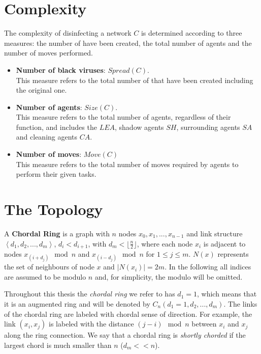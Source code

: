 \section{Complexity}
The complexity of disinfecting a network $C$ is determined according to three measures: 
the number of \bvs have been created, the total number of agents and the number of moves performed.
\begin{itemize}
\item {\bf Number of black viruses}:  $Spread(C)$.\\ 
This measure refers to the total number of \bvs that have been created including the original one.
\item {\bf Number of agents}:  $Size(C)$. \\
This measure refers to the total number of  agents, regardless of their function, and includes the $LEA$, shadow agents $SH$, surrounding agents $SA$ and cleaning agents $CA$. 



\item {\bf Number of moves}: $Move(C)$ \\
This measure refers to the total number of moves required by agents to perform their given tasks.

\end{itemize}



\section{The Topology}
A {\bf  Chordal Ring} is a graph  with   $n$ nodes $x_{0},x_{1},...,x_{n-1}$ and link structure
$\left\langle d_{1}, d_{2}, ..., d_{m}\right\rangle$, $d_{i} < d_{i+1}$, with  $d_m < \lfloor \frac{n}{2} \rfloor $, where
each node $x_{i}$ is adjacent to   nodes $x_{(i+d_{j})}\mod n$ and $x_{(i-d_{j})}\mod n$ for $1\leq j\leq m$.
 $N(x)$  represents the set of neighbours of node $x$ and $|N(x_i)|=2m$. 
In the following  all indices are assumed to be modulo $n$ and, for simplicity, the modulo will be omitted.



Throughout this thesis the {\it chordal ring} we refer to has $d_{1}=1$, which means that
it is an augmented ring and will be denoted by $C_n( d_1=1, d_{2}, ..., d_{m})$. 
The links of the chordal ring are labeled with chordal sense of direction. For example, the link $(x_i,x_j)$ is labeled with the distance $(j-i) \mod n$ between
$x_i$ and $x_j$ along the ring connection.
We say that a chordal ring is   {\em shortly chorded} if the largest chord is much smaller than $n$
($d_m<<n$).

